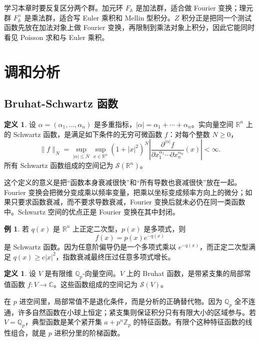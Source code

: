 \documentclass[11pt,a4paper,openany]{ctexbook}
\numberwithin{equation}{chapter}
\newcommand{\Q}{\mathbb{Q}}
\newcommand{\R}{\mathbb{R}}
\newcommand{\C}{\mathbb{C}}
\newcommand{\Z}{\mathbb{Z}}
\newcommand{\A}{\mathbb{A}}
\theoremstyle{plain}
\theoremstyle{definition}
\newtheorem{definition}[theorem]{定义}
\newtheorem{example}[theorem]{例}
\theoremstyle{remark}
\begin{document}
学习本章时要反复区分两个群。加元环 $F_{\A}$ 是加法群，适合做 Fourier 变换；理元群 $F_{\A}^{\times}$ 是乘法群，适合写 Euler 乘积和 Mellin 型积分。$Z$ 积分正是把同一个测试函数先放在加法对象上做 Fourier 变换，再限制到乘法对象上积分，因此它能同时看见 Poisson 求和与 Euler 乘积。

\section{调和分析}

\subsection{Bruhat-Schwartz 函数}

\begin{definition}
设 $\alpha=(\alpha_1,\ldots,\alpha_n)$ 是多重指标，$|\alpha|=\alpha_1+\cdots+\alpha_n$。实向量空间 $\R^n$ 上的 Schwartz 函数，是满足如下条件的无穷可微函数 $f$：对每个整数 $N\ge 0$，
\[
  \|f\|_N=
  \sup_{|\alpha|\le N}\sup_{x\in\R^n}
  (1+|x|^2)^N
  \left|
  \frac{\partial^{|\alpha|}f}{\partial x_1^{\alpha_1}\cdots\partial x_n^{\alpha_n}}(x)
  \right|
  <\infty .
\]
所有 Schwartz 函数组成的空间记为 $\mathcal S(\R^n)$。
\end{definition}

这个定义的意义是把“函数本身衰减很快”和“所有导数也衰减很快”放在一起。Fourier 变换会把微分变成乘以频率变量，把乘以坐标变成频率方向上的微分；如果只要求函数衰减，而不要求导数衰减，Fourier 变换后就未必仍在同一类函数中。Schwartz 空间的优点正是 Fourier 变换在其中封闭。

\begin{example}
若 $q(x)$ 是 $\R^n$ 上正定二次型，$p(x)$ 是多项式，则
\[
  f(x)=p(x)e^{-q(x)}
\]
是 Schwartz 函数。因为任意阶偏导仍是一个多项式乘以 $e^{-q(x)}$，而正定二次型满足 $q(x)\ge c|x|^2$，指数衰减最终压过任意多项式增长。
\end{example}

\begin{definition}
设 $V$ 是有限维 $\Q_p$-向量空间。$V$ 上的 Bruhat 函数，是带紧支集的局部常值函数 $f:V\to\C$。这些函数组成的空间记为 $\mathcal S(V)$。
\end{definition}

在 $p$ 进空间里，局部常值不是退化条件，而是分析的正确替代物。因为 $\Q_p$ 全不连通，许多自然函数在小球上恒定；紧支集则保证积分只有有限大小的区域参与。若 $V=\Q_p$，典型函数是某个紧开集 $a+p^n\Z_p$ 的特征函数。有限个这种特征函数的线性组合，就是 $p$ 进积分里的阶梯函数。
\end{document}
